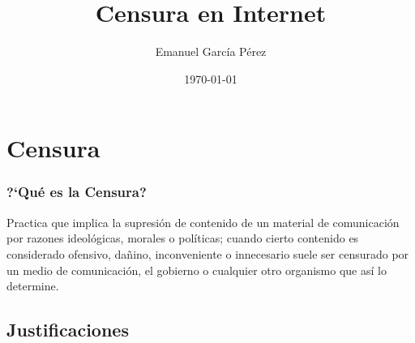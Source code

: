 \documentclass{beamer}
\title{\textbf{Censura en Internet}}
\author{Emanuel Garc\'ia P\'erez}
\date{\today}
\begin{document}
\frame[allowframebreaks]{\titlepage}
\section[Contenidos]{}
\frame{
\transdissolve[duration=0.2]
\tableofcontents
}


\section{Censura}
\frame
{
\transdissolve[duration=0.2]
\frametitle{?`Qu\'e es la Censura?}
Practica que implica la supresi\'on de contenido de un material de comunicaci\'on por razones ideol\'ogicas, morales o pol\'iticas; cuando cierto contenido es considerado ofensivo, da\~nino, inconveniente o innecesario suele ser censurado por un medio de comunicaci\'on, el gobierno o cualquier otro organismo que as\'i lo determine.
}

\subsection{Justificaciones}

\end{document}
